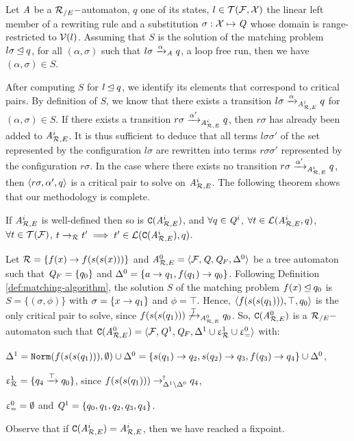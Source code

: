  
\begin{property}%
  \label{prop:matching-complete}
  Let $\mathit A$ be a ${\mathcal R_{/E}}-$automaton, $q$ one of its states, $l \in \mathcal{T(F, X)}$
  the linear left member of a rewriting rule and a substitution $\sigma : \mathcal X
  \mapsto \mathit Q$ whose domain is range-restricted to $\mathcal V(l)$. Assuming that $S$
  is the solution of the matching 
  problem $l\sigma \unlhd q$, for all $(\alpha, \sigma)$ such that
  $l\sigma \xrightarrow{\alpha}_\mathit A q$, a loop free run, then we have $(\alpha,
  \sigma) \in S$.
\end{property}


After computing $S$ for $l \unlhd q$, we identify its elements that
correspond to critical pairs. By definition of $S$, we know that there
exists a transition $l\sigma \xrightarrow{\alpha}_{{\it A}_{\mathcal R,E}^i} q$ for $(\alpha,
\sigma) \in S$. If there exists a transition $r\sigma
\xrightarrow{\alpha'}_{{\it A}_{\mathcal R,E}^i} q$, then $r\sigma$ has already been added to
${\it A}_{\mathcal R,E}^i$.  It is thus sufficient to deduce that all terms
$l\sigma\sigma'$ of the set represented by the configuration $l\sigma$
are rewritten into terms $r\sigma\sigma'$ represented by the
configuration $r\sigma$.  In the case where there exists no transition
$r\sigma \xrightarrow{\alpha'}_{{\it A}_{\mathcal R,E}^i} q$, then $\langle r\sigma, \alpha',
q\rangle$ is a critical pair to solve on ${\it A}_{\mathcal R,E}^i$.  The following
theorem shows that our methodology is complete.

\begin{theorem}
  \label{thm:C}
  If ${\it A}_{\mathcal R,E}^i$ is well-defined then so is $\mathtt{C}({\it A}_{\mathcal R,E}^i)$, 
  and $\forall q \in \mathit Q^i$, $\forall t \in
  \mathcal{L}({\it A}_{\mathcal R,E}^i, q)$, $\forall t \in\mathcal{T(F)}$, $t \rightarrow_\mathcal R t' \; \Longrightarrow \; t' \in
  \mathcal{L}(\mathtt{C}({\it A}_{\mathcal R,E}^{i}), q)$.
\end{theorem}

\begin{example}
  \label{ex:C}
  Let $\mathcal R=\{f(x) \rightarrow f(s(s(x)))\}$ and ${\it A}_{\mathcal R,E}^0=\langle \mathcal{F}, \mathit Q,
  \mathit Q_F, \Delta^0\rangle$ be a tree automaton such that $\mathit Q_F=\{q_0\}$
  and $\Delta^0=\{ a \rightarrow q_1, f(q_1) \rightarrow q_0\}$.  Following Definition
  \ref{def:matching-algorithm}, the solution $S$ of the matching
  problem $f(x)\unlhd q_0 $ is $S=\{(\sigma,\phi)\}$ with
  $\sigma=\{x\rightarrow q_1\}$ and $\phi=\top$.  Hence, $\langle f(s(s(q_1))),
  \top, q_0\rangle$ is the only critical pair to solve, since
  $f(s(s(q_1)))\not\xrightarrow{\top}_{{\it A}_{\mathcal R,E}^0} q_0$.  So,
  $\mathtt{C}({\it A}_{\mathcal R,E}^0) $ is a ${\mathcal R_{/E}}-$automaton such that
  $\mathtt{C}({\it A}_{\mathcal R,E}^0)= \langle\mathcal{F}, \mathit Q^1, \mathit Q_F, \Delta^1\cup \upvarepsilon_{\mathcal R}^1 \cup
  \upvarepsilon_{=}^0 \rangle$ with:
  \begin{description}
  \item $\Delta^1=\mathtt{Norm}(f(s(s(q_1))),\emptyset) \cup \Delta^0= \{s(q_1)\rightarrow q_2,s(q_2)\rightarrow q_3, f(q_3)\rightarrow q_4\}\cup \Delta^0$, 
  \item $\upvarepsilon_{\mathcal R}^1=\{q_4 \xrightarrow{\top} q_0\}$, since $f(s(s(q_1)))\rightarrow^!_{\Delta^1\setminus\Delta^0} q_4$, 
  \item $\upvarepsilon_{=}^0=\emptyset$ and $\mathit Q^1=\{q_0,q_1,q_2,q_3,q_4\}$.
  \end{description}
\end{example}
Observe that if $\mathtt{C}({\it A}_{\mathcal R,E}^i)={\it A}_{\mathcal R,E}^i$, then we have reached a fixpoint.
\vspace{-.6cm}
